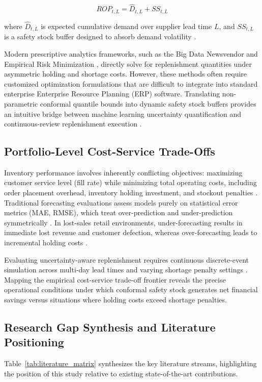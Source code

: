 \begin{equation}
ROP_{t,L} = \hat{D}_{t,L} + SS_{t,L}
\end{equation}

where $\hat{D}_{t,L}$ is expected cumulative demand over supplier lead time $L$, and $SS_{t,L}$ is a safety stock buffer designed to absorb demand volatility \cite{silver1998inventory}.

Modern prescriptive analytics frameworks, such as the Big Data Newsvendor \cite{ban2019big} and Empirical Risk Minimization \cite{bertsimas2020predictive}, directly solve for replenishment quantities under asymmetric holding and shortage costs. However, these methods often require customized optimization formulations that are difficult to integrate into standard enterprise Enterprise Resource Planning (ERP) software. Translating non-parametric conformal quantile bounds into dynamic safety stock buffers provides an intuitive bridge between machine learning uncertainty quantification and continuous-review replenishment execution \cite{huber2019integrating}.

\subsection{Portfolio-Level Cost-Service Trade-Offs}
Inventory performance involves inherently conflicting objectives: maximizing customer service level (fill rate) while minimizing total operating costs, including order placement overhead, inventory holding investment, and stockout penalties \cite{silver1998inventory, snyder2019fundamentals}. Traditional forecasting evaluations assess models purely on statistical error metrics (MAE, RMSE), which treat over-prediction and under-prediction symmetrically \cite{gneiting2007strictly}. In lost-sales retail environments, under-forecasting results in immediate lost revenue and customer defection, whereas over-forecasting leads to incremental holding costs \cite{spanos2022application, malik2024sales}.

Evaluating uncertainty-aware replenishment requires continuous discrete-event simulation across multi-day lead times and varying shortage penalty settings \cite{huber2019integrating}. Mapping the empirical cost-service trade-off frontier reveals the precise operational conditions under which conformal safety stock generates net financial savings versus situations where holding costs exceed shortage penalties.

\subsection{Research Gap Synthesis and Literature Positioning}
Table~\ref{tab:literature_matrix} synthesizes the key literature streams, highlighting the position of this study relative to existing state-of-the-art contributions.

